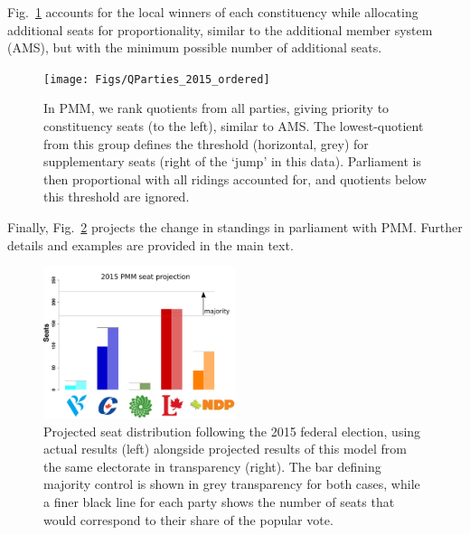 \documentclass[DIV=calc, paper=a4, fontsize=11pt, twocolumn]{scrartcl}	 %
\begin{document}
Fig.~\ref{fig:sumQParties-2015-ordered} accounts for the local winners of each constituency while allocating additional seats for proportionality, similar to the additional member system (AMS), but with the minimum possible number of additional seats.

\begin{figure}[h!]
\texttt{[image: Figs/QParties\_2015\_ordered]}
\caption{ In PMM, we rank quotients from all parties, giving priority to constituency seats (to the left), similar to AMS. The lowest-quotient from this group defines the threshold (horizontal, grey) for supplementary seats (right of the `jump' in this data). Parliament is then proportional with all ridings accounted for, and quotients below this threshold are ignored.}
\label{fig:sumQParties-2015-ordered}
\end{figure}

Finally, Fig.~\ref{fig:hypo_2015_sum} projects the change in standings in parliament with PMM. Further details and examples are provided in the main text.

\begin{figure}[h!]
  \includegraphics[width=0.50\textwidth,clip]{Figs/2015_seat_projection}
  \caption{Projected seat distribution following the 2015 federal election, using actual results (left) alongside projected results of this model from the same electorate in transparency (right). The bar defining majority control is shown in grey transparency for both cases, while a finer black line for each party shows the number of seats that would correspond to their share of the popular vote.}
\label{fig:hypo_2015_sum}
\end{figure}

\pagebreak


\maketitle %
\thispagestyle{fancy} %
\end{document}
